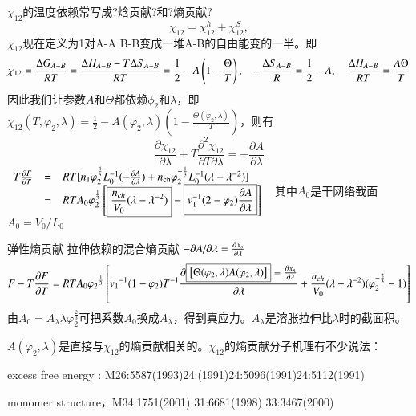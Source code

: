 \documentclass{article} %
\begin{document}
\noindent $\chi _{12} $的温度依赖常写成?焓贡献?和?熵贡献?
\[\chi _{12} =\chi _{12}^{h} +\chi _{12}^{S} ,\] 
$\chi _{12} $现在定义为1对A-A B-B变成一堆A-B的自由能变的一半。即
\[\chi _{12} =\frac{{\rm \Delta }G_{A-B} }{RT} =\frac{{\rm \Delta }H_{A-B} -T\Delta S_{A-B} }{RT} =\frac{1}{2} -A\left(1-\frac{\Theta }{T} \right),\quad -\frac{{\rm \Delta }S_{A-B} }{R} =\frac{1}{2} -A,\quad \frac{{\rm \Delta }H_{A-B} }{RT} =\frac{A\Theta }{T} \] 
因此我们让参数$A$和$\Theta $都依赖$\phi _{2} $和$\lambda $，即$\chi _{12} (T,\varphi _{2} ,\lambda )=\frac{1}{2} -A(\varphi _{2} ,\lambda )(1-\frac{\Theta (\varphi _{2} ,\lambda )}{T} )$，则有
\[\frac{\partial \chi _{12} }{\partial \lambda } +T\frac{\partial ^{2} \chi _{12} }{\partial T\partial \lambda } =-\frac{\partial A}{\partial \lambda } \] 
$\begin{array}{rcl} {T\frac{\partial F}{\partial T} } & {=} & {RT[n_{1} \varphi _{2}^{\frac{4}{3} } L_{0}^{-1} (-\frac{\partial A}{\partial \lambda } )+n_{{\rm ch}} \varphi _{2}^{-\frac{1}{3} } L_{0}^{-1} (\lambda -\lambda ^{-2} )]} \\ {} & {=} & {RTA_{0} \varphi _{2}^{\frac{1}{3} } \left[\boxed{\frac{n_{ch} }{V_{0} } (\lambda -\lambda ^{-2} )} -\boxed{v_{1}^{-1} (2-\varphi _{2} )\frac{\partial A}{\partial \lambda } } \right]\; } \end{array}$ 其中$A_{0} $是干网络截面$A_{0} =V_{0} /L_{0} $ 

\noindent                  弹性熵贡献  拉伸依赖的混合熵贡献  $-{\partial A\mathord{\left/ {\vphantom {\partial A \partial }} \right. \kern-\nulldelimiterspace} \partial } \lambda =\frac{\partial x_{s} }{\partial \lambda } $ 
\[F-T\frac{\partial F}{\partial T} =RTA_{0} \varphi _{2} {}^{\frac{1}{3} } \left[v_{1} {}^{-1} (1-\varphi _{2} )T^{-1} \frac{\partial \boxed{\left[{\rm \Theta }(\varphi _{2} ,\lambda )A(\varphi _{2} ,\lambda )\right]} \equiv \frac{\partial x_{n} }{\partial \lambda } }{\partial \lambda } +\frac{n_{ch} }{V_{0} } (\lambda -\lambda ^{-2} )(\varphi _{2}^{-\frac{2}{3} } -1)\right]\] 
由$A_{0} =A_{\lambda } \lambda \varphi _{2}^{\frac{2}{3} } $可把系数$A_{0} $换成$A_{\lambda } $，得到真应力。$A_{\lambda } $是溶胀拉伸比$\lambda $时的截面积。

\noindent $A(\varphi _{2} ,\lambda )$是直接与$\chi _{12} $的熵贡献相关的。$\chi _{12} $的熵贡献分子机理有不少说法：

\noindent excess free energy : M26:5587(1993)24:(1991)24:5096(1991)24:5112(1991)

\noindent monomer structure，M34:1751(2001) 31:6681(1998) 33:3467(2000)
\end{document}
